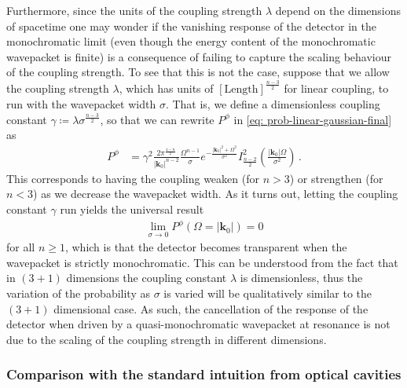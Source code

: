 \documentclass[11pt,prd,onecolumn,superscriptaddress,nofootinbib,floatfix,amsmath,amssymb]{revtex4-2}
\newcommand{\bk}{{\bm{k}}}
\newcommand{\eri}[1]{\textcolor{OliveGreen}{\textbf{[\textbf{\textcolor{black}{Erickson}}: #1]}}}
\begin{document}
    
    Furthermore, since the units of the coupling strength $\lambda$ depend on the dimensions of spacetime one may wonder if the vanishing response of the detector in the monochromatic limit (even though the energy content of the monochromatic wavepacket is finite) is a consequence of failing to capture the scaling behaviour of the coupling strength. To see that this is not the case, suppose that we allow the coupling strength $\lambda$, which has units of $[\text{Length}]^\frac{n-3}{2}$ for linear coupling, to run with the wavepacket width $\sigma$. That is, we define a dimensionless coupling constant $\gamma \coloneqq \lambda \sigma^{\frac{n-3}{2}}$, so that we can rewrite $P^\phi$ in \eqref{eq: prob-linear-gaussian-final} as
    \begin{align}
        P^\phi &= \gamma^2  \frac{2\pi ^{\frac{4-n}{2}}}{|\bk_0|^{n-2}} \frac{\Omega ^{n-1}}{\sigma} e^{-\frac{|\bk_0|^2+\Omega ^2}{\sigma ^2}} I^2_{\frac{n-2}{2}}\left(\frac{|\bk_0| \Omega }{\sigma ^2}\right)\,.
    \end{align}
    This corresponds to having the coupling weaken (for $n>3$) or strengthen (for $n<3$) as we  decrease the wavepacket width. As it turns out, letting the coupling constant $\gamma$ run yields the universal result
    \begin{align}
        \lim_{\sigma \to 0}P^\phi(\Omega=|\bk_0|) = 0
    \end{align}
    for all $n\geq 1$, which is that the detector becomes transparent when the wavepacket is strictly monochromatic. This can be understood from the fact that in $(3+1)$ dimensions the coupling constant $\lambda$ is dimensionless, thus the variation of the probability as $\sigma$ is varied will be qualitatively similar to the $(3+1)$ dimensional case. As such, the cancellation of the response of the detector when driven by a quasi-monochromatic wavepacket at resonance is not due to the scaling of the coupling strength in different dimensions.
    
    
    
    
    
    
    
    \subsubsection*{Comparison with the standard intuition from optical cavities}
    \label{subsec: cavity-calculation}
    
    
\end{document}
